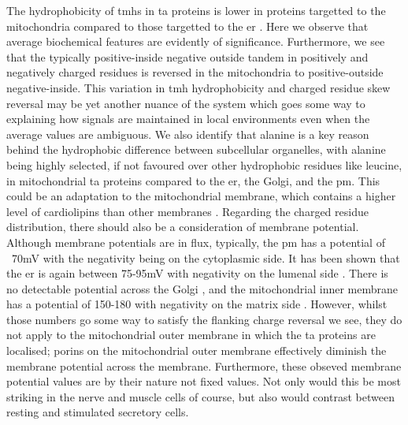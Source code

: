 The hydrophobicity of \gls{tmh}s in \gls{ta} proteins is lower in proteins targetted to the mitochondria compared to those targetted to the \gls{er} \cite{Borgese2007}.
Here we observe that average biochemical features are evidently of significance.
Furthermore, we see that the typically positive\--inside negative outside tandem in positively and negatively charged residues is reversed in the mitochondria to positive\--outside negative\--inside.
This variation in \gls{tmh} hydrophobicity and charged residue skew reversal may be yet another nuance of the system which goes some way to explaining how signals are maintained in local environments even when the average values are ambiguous.
We also identify that alanine is a key reason behind the hydrophobic difference between subcellular organelles, with alanine being highly selected, if not favoured over other hydrophobic residues like leucine, in mitochondrial \gls{ta} proteins compared to the \gls{er}, the Golgi, and the \gls{pm}.
This could be an adaptation to the mitochondrial membrane, which contains a higher level of cardiolipins than other membranes \cite{VanMeer2008, Gebert2009}.
Regarding the charged residue distribution, there should also be a consideration of membrane potential.
Although membrane potentials are in flux, typically, the \gls{pm} has a potential of ~70mV with the negativity being on the cytoplasmic side.
It has been shown that the \gls{er} is again between 75-95mV with negativity on the lumenal side \cite{Qin2011, Worley1994}.
There is no detectable potential across the Golgi \cite{Schapiro2000}, and the mitochondrial inner membrane has a potential of 150-180 with negativity on the matrix side \cite{Perry2011}.
However, whilst those numbers go some way to satisfy the flanking charge reversal we see, they do not apply to the mitochondrial outer membrane in which the \gls{ta} proteins are localised; porins on the mitochondrial outer membrane effectively diminish the membrane potential across the membrane.
Furthermore, these obseved membrane potential values are by their nature not fixed values.
Not only would this be most striking in the nerve and muscle cells of course, but also would contrast between resting and stimulated secretory cells.

